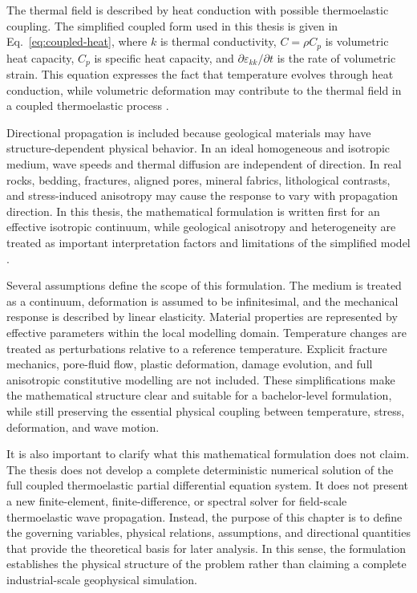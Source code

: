 The thermal field is described by heat conduction with possible thermoelastic coupling. The simplified coupled form used in this thesis is given in Eq.~\eqref{eq:coupled-heat}, where \(k\) is thermal conductivity, \(C=\rho C_p\) is volumetric heat capacity, \(C_p\) is specific heat capacity, and \(\partial \varepsilon_{kk}/\partial t\) is the rate of volumetric strain. This equation expresses the fact that temperature evolves through heat conduction, while volumetric deformation may contribute to the thermal field in a coupled thermoelastic process \cite{nowacki1986,boley1960}.

Directional propagation is included because geological materials may have structure-dependent physical behavior. In an ideal homogeneous and isotropic medium, wave speeds and thermal diffusion are independent of direction. In real rocks, bedding, fractures, aligned pores, mineral fabrics, lithological contrasts, and stress-induced anisotropy may cause the response to vary with propagation direction. In this thesis, the mathematical formulation is written first for an effective isotropic continuum, while geological anisotropy and heterogeneity are treated as important interpretation factors and limitations of the simplified model \cite{mavko2009,aki2002}.

Several assumptions define the scope of this formulation. The medium is treated as a continuum, deformation is assumed to be infinitesimal, and the mechanical response is described by linear elasticity. Material properties are represented by effective parameters within the local modelling domain. Temperature changes are treated as perturbations relative to a reference temperature. Explicit fracture mechanics, pore-fluid flow, plastic deformation, damage evolution, and full anisotropic constitutive modelling are not included. These simplifications make the mathematical structure clear and suitable for a bachelor-level formulation, while still preserving the essential physical coupling between temperature, stress, deformation, and wave motion.

It is also important to clarify what this mathematical formulation does not claim. The thesis does not develop a complete deterministic numerical solution of the full coupled thermoelastic partial differential equation system. It does not present a new finite-element, finite-difference, or spectral solver for field-scale thermoelastic wave propagation. Instead, the purpose of this chapter is to define the governing variables, physical relations, assumptions, and directional quantities that provide the theoretical basis for later analysis. In this sense, the formulation establishes the physical structure of the problem rather than claiming a complete industrial-scale geophysical simulation.


